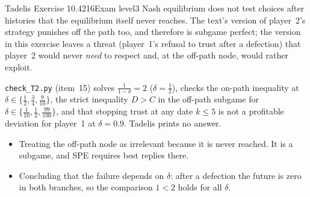 \begin{exsol}{Tadelis Exercise 10.4}{216}{Exam level}{3}
\interp Nash equilibrium does not test choices after histories that the equilibrium itself never reaches.
The text's version of player~2's strategy punishes off the path too, and therefore is subgame perfect; the
version in this exercise leaves a threat (player~1's refusal to trust after a defection) that player~2 would never
\emph{need} to respect and, at the off-path node, would rather exploit.

\verify \texttt{check\_T2.py} (item~15) solves $\frac1{1-\delta} = 2$ ($\delta = \frac12$), checks the on-path
inequality at $\delta \in \{\frac12, \frac34, \frac9{10}\}$, the strict inequality $D > C$ in the off-path
subgame for $\delta \in \{\frac1{10}, \frac12, \frac{99}{100}\}$, and that stopping trust at any date
$k \le 5$ is not a profitable deviation for player~1 at $\delta = 0.9$. Tadelis prints no answer.

\mistakes
\begin{itemize}
  \item Treating the off-path node as irrelevant because it is never reached. It is a subgame, and SPE
  requires best replies there.
  \item Concluding that the failure depends on $\delta$: after a defection the future is zero in both branches,
  so the comparison $1 < 2$ holds for all $\delta$.
\end{itemize}

\end{exsol}
